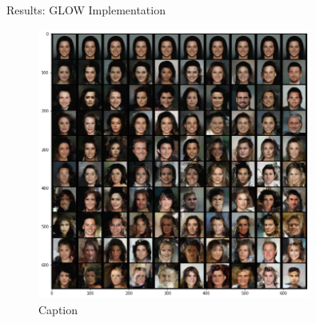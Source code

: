 \begin{frame}{Results: GLOW Implementation}
    \begin{figure}
        \centering
        \includegraphics[width=0.8\textwidth]{Images/celeb_multiple_stds2.png}
        \caption{Caption}
    \end{figure}
\end{frame}

